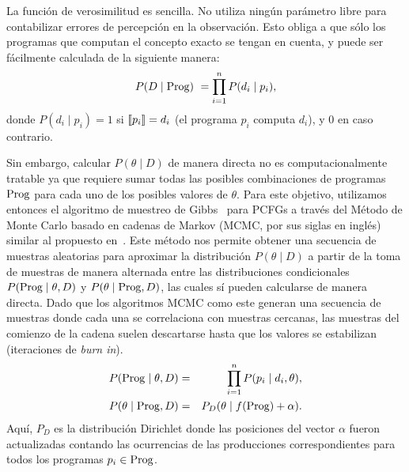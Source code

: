 
La función de verosimilitud es sencilla. No utiliza ningún parámetro libre para contabilizar errores de percepción en la observación. Esto obliga a que sólo los programas que computan el concepto exacto se tengan en cuenta, y puede ser fácilmente calculada de la siguiente manera:
%
\begin{equation*}
\label{eqD}
P(D \mid {\rm Prog})\ = \prod\limits_{i = 1}^n P(d_i \mid p_i),
\end{equation*}
%
donde $P(d_i \mid p_i) = 1 $ si $\llbracket p_i\rrbracket = d_i$ (el programa $p_i$ computa $d_i$), y 0 en caso contrario. 

Sin embargo, calcular $P(\theta \mid D)$ de manera directa no es computacionalmente tratable ya que requiere sumar todas las posibles combinaciones de programas ${\rm Prog}$ para cada uno de los posibles valores de $\theta$. Para este objetivo, utilizamos entonces el algoritmo de muestreo de Gibbs~\cite{geman1984stochastic} para PCFGs a través del Método de Monte Carlo basado en cadenas de Markov (MCMC, por sus siglas en inglés) similar al propuesto en~\cite{johnson2007bayesian}. Este método nos permite obtener una secuencia de muestras aleatorias para aproximar la distribución $P(\theta \mid D)$ a partir de la toma de muestras de manera alternada entre las distribuciones condicionales $P({\rm Prog} \mid \theta, D)$ y $P(\theta \mid {\rm Prog}, D)$, las cuales sí pueden calcularse de manera directa. Dado que los algoritmos MCMC como este generan una secuencia de muestras donde cada una se correlaciona con muestras cercanas, las muestras del comienzo de la cadena suelen descartarse hasta que los valores se estabilizan (iteraciones de \textit{burn in}).
%
\begin{eqnarray*}
\label{eqE}
P({\rm Prog} \mid \theta, D) &=& \prod\limits_{i=1}^n P(p_i \mid d_i, \theta),\\
P(\theta \mid {\rm Prog}, D) &=& P_D(\theta \mid f({\rm Prog}) + \alpha).
\end{eqnarray*}
Aquí, $P_D$ es la distribución Dirichlet donde las posiciones del vector $\alpha$ fueron actualizadas contando las ocurrencias de las producciones correspondientes para todos los programas $p_i \in {\rm Prog}$.

